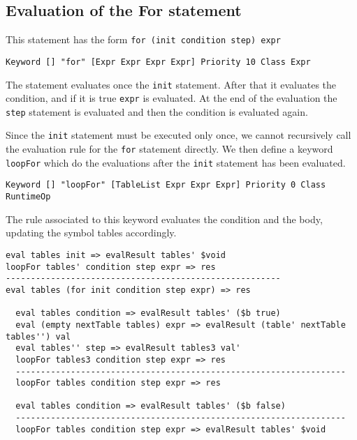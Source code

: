 \subsection{Evaluation of the For statement}
This statement has the form \texttt{for (init condition step) expr}

\begin{lstlisting}
Keyword [] "for" [Expr Expr Expr Expr] Priority 10 Class Expr
\end{lstlisting}

\noindent
The statement evaluates once the \texttt{init} statement. After that it evaluates the condition, and if it is true \texttt{expr} is evaluated. At the end of the evaluation the \texttt{step} statement is evaluated and then the condition is evaluated again.

Since the \texttt{init} statement must be executed only once, we cannot recursively call the evaluation rule for the \texttt{for} statement directly. We then define a keyword \texttt{loopFor} which do the evaluations after the \texttt{init} statement has been evaluated.

\noindent
\begin{lstlisting}
Keyword [] "loopFor" [TableList Expr Expr Expr] Priority 0 Class RuntimeOp
\end{lstlisting}

\noindent
The rule associated to this keyword evaluates the condition and the body, updating the symbol tables accordingly.
\begin{lstlisting}
eval tables init => evalResult tables' $void
loopFor tables' condition step expr => res
-------------------------------------------------------
eval tables (for init condition step expr) => res

  eval tables condition => evalResult tables' ($b true)
  eval (empty nextTable tables) expr => evalResult (table' nextTable tables'') val
  eval tables'' step => evalResult tables3 val'
  loopFor tables3 condition step expr => res 
  ------------------------------------------------------------------
  loopFor tables condition step expr => res

  eval tables condition => evalResult tables' ($b false)
  ------------------------------------------------------------------
  loopFor tables condition step expr => evalResult tables' $void
\end{lstlisting}